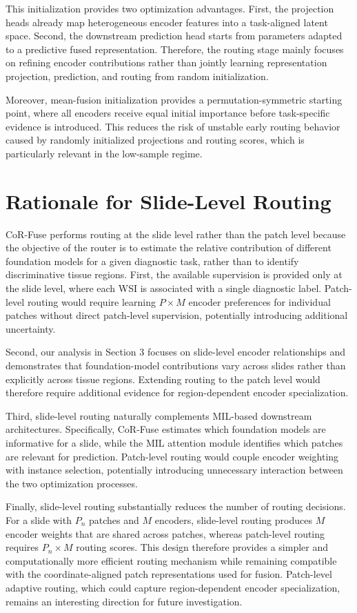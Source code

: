 This initialization provides two optimization advantages.
First, the projection heads already map heterogeneous encoder features into a task-aligned latent space.
Second, the downstream prediction head starts from parameters adapted to a predictive fused representation.
Therefore, the routing stage mainly focuses on refining encoder contributions rather than jointly learning representation projection, prediction, and routing from random initialization.

Moreover, mean-fusion initialization provides a permutation-symmetric starting point, where all encoders receive equal initial importance before task-specific evidence is introduced.
This reduces the risk of unstable early routing behavior caused by randomly initialized projections and routing scores, which is particularly relevant in the low-sample regime.


\section{Rationale for Slide-Level Routing}
\label{slide-level reasons}
CoR-Fuse performs routing at the slide level rather than the patch level because the objective of the router is to estimate the relative contribution of different foundation models for a given diagnostic task, rather than to identify discriminative tissue regions. First, the available supervision is provided only at the slide level, where each WSI is associated with a single diagnostic label. Patch-level routing would require learning \(P\times M\) encoder preferences for individual patches without direct patch-level supervision, potentially introducing additional uncertainty.

Second, our analysis in Section 3 focuses on slide-level encoder relationships and demonstrates that foundation-model contributions vary across slides rather than explicitly across tissue regions. Extending routing to the patch level would therefore require additional evidence for region-dependent encoder specialization.

Third, slide-level routing naturally complements MIL-based downstream architectures. Specifically, CoR-Fuse estimates which foundation models are informative for a slide, while the MIL attention module identifies which patches are relevant for prediction. Patch-level routing would couple encoder weighting with instance selection, potentially introducing unnecessary interaction between the two optimization processes.

Finally, slide-level routing substantially reduces the number of routing decisions. For a slide with \(P_n\) patches and \(M\) encoders, slide-level routing produces \(M\) encoder weights that are shared across patches, whereas patch-level routing requires \(P_n\times M\) routing scores. This design therefore provides a simpler and computationally more efficient routing mechanism while remaining compatible with the coordinate-aligned patch representations used for fusion. Patch-level adaptive routing, which could capture region-dependent encoder specialization, remains an interesting direction for future investigation.